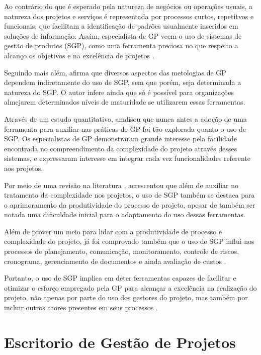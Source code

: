 Ao contrário do que é esperado pela natureza de negócios ou operações usuais, a natureza dos projetos e serviços é representada por processos curtos, repetitvos e funcionais, que facilitam a identificação de padrões usualmente inseridos em soluções de informação. Assim, especialista de GP veem o uso de sistemas de gestão de produtos (SGP), como uma ferramenta preciosa no que respeito a alcanço os objetivos e na excelência de projetos \cite{cserban2011project}.

Seguindo mais além,  afirma que diversos aspectos das metologias de GP dependem indiretamente do uso de SGP, sem que porém, seja determinada a natureza do SGP. O autor infere ainda que só é possível para organizações almejarem determinados níveis de maturidade se utilizarem essas ferramentas.

Através de um estudo quantitativo,  analisou que nunca antes a adoção de uma ferramenta para auxiliar nas práticas de GP foi tão explorada quanto o uso de SGP. Os especialistas de GP demonstraram grande interesse pela facilidade encontrada no compreendimento da complexidade do projeto através desses sistemas, e expressaram interesse em integrar cada vez funcionalidades referente aos projetos.

Por meio de uma revisão na literatura , acrescentou que além de auxiliar no tratamento da complexidade nos projetos, o uso de SGP também se destaca para o aprimoramento da produtividade do processo de projeto, apesar de também ser notada uma dificuldade inicial para o adaptamento do uso dessas ferramentas.

Além de prover um meio para lidar com a produtividade de processo e complexidade do projeto, já foi comprovado também que o uso de SGP influi nos processos de planejamento, comunicação, monitoramento, controle de riscos, cronograma, gerenciamento de documentos e ainda avaliação de custos \cite{raymond2008project}.

Portanto, o uso de SGP implica em deter ferramentas capazes de facilitar e otimizar o esforço empregado pela GP para alcançar a excelência na realização do projeto, não apenas por parte do uso dos gestores do projeto, mas também por incluir outros atores presentes em seus processos \cite{cserban2011project}.


\section{Escritorio de Gestão de Projetos}

